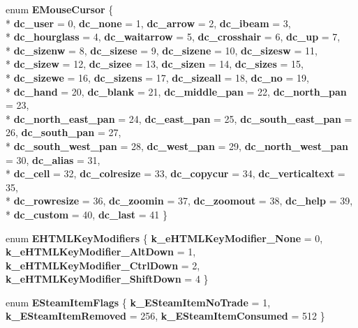 \begin{DoxyCompactItemize}
\item 
\hypertarget{namespaceValve_1_1Steamworks_adbc66e61d3df560d3ebf58fb76b2f0ca}{}enum {\bfseries E\+Mouse\+Cursor} \{ \\*
{\bfseries dc\+\_\+user} = 0, 
{\bfseries dc\+\_\+none} = 1, 
{\bfseries dc\+\_\+arrow} = 2, 
{\bfseries dc\+\_\+ibeam} = 3, 
\\*
{\bfseries dc\+\_\+hourglass} = 4, 
{\bfseries dc\+\_\+waitarrow} = 5, 
{\bfseries dc\+\_\+crosshair} = 6, 
{\bfseries dc\+\_\+up} = 7, 
\\*
{\bfseries dc\+\_\+sizenw} = 8, 
{\bfseries dc\+\_\+sizese} = 9, 
{\bfseries dc\+\_\+sizene} = 10, 
{\bfseries dc\+\_\+sizesw} = 11, 
\\*
{\bfseries dc\+\_\+sizew} = 12, 
{\bfseries dc\+\_\+sizee} = 13, 
{\bfseries dc\+\_\+sizen} = 14, 
{\bfseries dc\+\_\+sizes} = 15, 
\\*
{\bfseries dc\+\_\+sizewe} = 16, 
{\bfseries dc\+\_\+sizens} = 17, 
{\bfseries dc\+\_\+sizeall} = 18, 
{\bfseries dc\+\_\+no} = 19, 
\\*
{\bfseries dc\+\_\+hand} = 20, 
{\bfseries dc\+\_\+blank} = 21, 
{\bfseries dc\+\_\+middle\+\_\+pan} = 22, 
{\bfseries dc\+\_\+north\+\_\+pan} = 23, 
\\*
{\bfseries dc\+\_\+north\+\_\+east\+\_\+pan} = 24, 
{\bfseries dc\+\_\+east\+\_\+pan} = 25, 
{\bfseries dc\+\_\+south\+\_\+east\+\_\+pan} = 26, 
{\bfseries dc\+\_\+south\+\_\+pan} = 27, 
\\*
{\bfseries dc\+\_\+south\+\_\+west\+\_\+pan} = 28, 
{\bfseries dc\+\_\+west\+\_\+pan} = 29, 
{\bfseries dc\+\_\+north\+\_\+west\+\_\+pan} = 30, 
{\bfseries dc\+\_\+alias} = 31, 
\\*
{\bfseries dc\+\_\+cell} = 32, 
{\bfseries dc\+\_\+colresize} = 33, 
{\bfseries dc\+\_\+copycur} = 34, 
{\bfseries dc\+\_\+verticaltext} = 35, 
\\*
{\bfseries dc\+\_\+rowresize} = 36, 
{\bfseries dc\+\_\+zoomin} = 37, 
{\bfseries dc\+\_\+zoomout} = 38, 
{\bfseries dc\+\_\+help} = 39, 
\\*
{\bfseries dc\+\_\+custom} = 40, 
{\bfseries dc\+\_\+last} = 41
 \}\label{namespaceValve_1_1Steamworks_adbc66e61d3df560d3ebf58fb76b2f0ca}

\item 
\hypertarget{namespaceValve_1_1Steamworks_a123428c00807a8caf41e604d625ee806}{}enum {\bfseries E\+H\+T\+M\+L\+Key\+Modifiers} \{ {\bfseries k\+\_\+e\+H\+T\+M\+L\+Key\+Modifier\+\_\+\+None} = 0, 
{\bfseries k\+\_\+e\+H\+T\+M\+L\+Key\+Modifier\+\_\+\+Alt\+Down} = 1, 
{\bfseries k\+\_\+e\+H\+T\+M\+L\+Key\+Modifier\+\_\+\+Ctrl\+Down} = 2, 
{\bfseries k\+\_\+e\+H\+T\+M\+L\+Key\+Modifier\+\_\+\+Shift\+Down} = 4
 \}\label{namespaceValve_1_1Steamworks_a123428c00807a8caf41e604d625ee806}

\item 
\hypertarget{namespaceValve_1_1Steamworks_a40c19ecf80d0aa48b6dd113b3ca44875}{}enum {\bfseries E\+Steam\+Item\+Flags} \{ {\bfseries k\+\_\+\+E\+Steam\+Item\+No\+Trade} = 1, 
{\bfseries k\+\_\+\+E\+Steam\+Item\+Removed} = 256, 
{\bfseries k\+\_\+\+E\+Steam\+Item\+Consumed} = 512
 \}\label{namespaceValve_1_1Steamworks_a40c19ecf80d0aa48b6dd113b3ca44875}

\end{DoxyCompactItemize}
